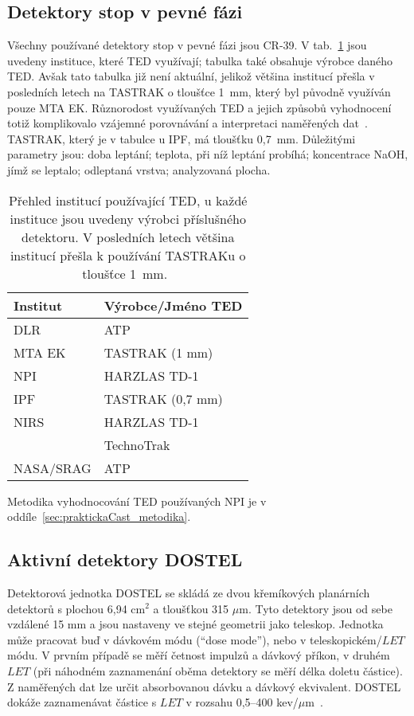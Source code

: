 \subsection{Detektory stop v pevné fázi}
Všechny používané detektory stop v pevné fázi jsou CR-39. V tab.~\ref{tab:dosis_pouzivaneTED} jsou uvedeny instituce, které TED využívají; tabulka také obsahuje výrobce daného TED. Avšak tato tabulka již není aktuální, jelikož většina institucí přešla v posledních letech na TASTRAK o tloušťce 1~mm, který byl původně využíván pouze MTA EK. Různorodost využívaných TED a jejich způsobů vyhodnocení totiž komplikovalo vzájemné porovnávání a interpretaci naměřených dat~\cite{cesky}. TASTRAK, který je v tabulce u IPF, má tloušťku 0,7~mm. Důležitými parametry jsou: doba leptání; teplota, při níž leptání probíhá; koncentrace NaOH, jímž se leptalo; odleptaná vrstva; analyzovaná plocha.
\begin{table}[h]
  \centering
  \caption{Přehled institucí používající TED, u každé instituce jsou uvedeny výrobci příslušného detektoru. V posledních letech většina institucí přešla k používání TASTRAKu o tloušťce 1~mm.~\cite{dosis}}
  \label{tab:dosis_pouzivaneTED}
  \begin{tabular}{ll}
	\toprule
	Institut& Výrobce/Jméno TED\\
	\midrule
	DLR&ATP\\
	MTA EK&TASTRAK (1 mm)\\
	NPI&HARZLAS TD-1\\
	IPF&TASTRAK (0,7 mm)\\ 
	NIRS&HARZLAS TD-1\\
		&TechnoTrak\\
	NASA/SRAG&ATP\\
	\bottomrule
  \end{tabular}
\end{table}

Metodika vyhodnocování TED používaných NPI je v oddíle~\ref{sec:praktickaCast_metodika}.

\subsection{Aktivní detektory DOSTEL}\label{experimentDosis_activeDetectors}
Detektorová jednotka DOSTEL se skládá ze dvou křemíkových planárních detektorů s plochou  6,94 cm$^2$ a tloušťkou 315 $\mu$m. Tyto detektory jsou od sebe vzdálené 15 mm a jsou nastaveny ve stejné geometrii jako teleskop. Jednotka může pracovat buď v dávkovém módu (``dose mode''), nebo v teleskopickém/$\mathit{LET}$ módu. V prvním případě se měří četnost impulzů a dávkový příkon, v druhém $\mathit{LET}$ (při náhodném zaznamenání oběma detektory se měří délka doletu částice). Z naměřených dat lze určit absorbovanou dávku a dávkový ekvivalent. DOSTEL dokáže zaznamenávat částice s $\mathit{LET}$ v rozsahu 0,5--400 kev/$\mu$m~\cite{activeDetectors}. 

